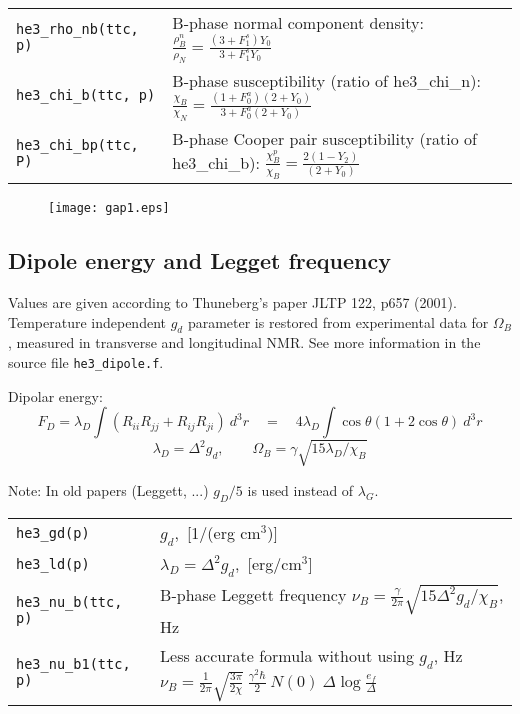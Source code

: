 \documentclass[a4paper]{article}
\begin{document}
\begin{tabular}{lp{11cm}}
\tt he3\_rho\_nb(ttc, p)     &B-phase normal component density:
                             $\displaystyle \frac{\rho_B^n}{\rho_{N}} =
                               \frac{(3 + F_1^s) Y_0}{3 + F_1^s Y_0}$\\[3mm]
\tt he3\_chi\_b(ttc, p)      &B-phase susceptibility (ratio of he3\_chi\_n):
                             $\displaystyle \frac{\chi_B}{\chi_N} =
                               \frac{(1+F_0^a)(2 + Y_0)}
                                     {3+F_0^a(2 + Y_0)}$\\[3mm]
\tt he3\_chi\_bp(ttc, P)     &B-phase Cooper pair susceptibility (ratio of he3\_chi\_b):
                             $\displaystyle \frac{\chi^p_B}{\chi_B} =
                               \frac{2 (1-Y_2)}{(2 + Y_0)}$\\
\end{tabular}
\medskip

\begin{figure}[h]
\texttt{[image: gap1.eps]}\\
\end{figure}
\eject

\subsection*{Dipole energy and Legget frequency}

Values are given according to Thuneberg's paper JLTP 122, p657 (2001).
Temperature independent $g_d$ parameter is restored from experimental
data for $\Omega_B$, measured in transverse and longitudinal NMR.
See more information in the source file {\tt he3\_dipole.f}.

Dipolar energy:
$$
F_D = \lambda_D \int (R_{ii}R_{jj}+R_{ij}R_{ji})\ d^3r
\quad =\quad 4 \lambda_D \int \cos\theta(1+2\cos\theta)\ d^3r
$$
$$
\lambda_D = \Delta^2 g_d,
\qquad \Omega_B = \gamma \sqrt{15 \lambda_D/\chi_B}
$$

Note: In old papers (Leggett, ...) $g_D/5$ is used instead of $\lambda_G$.

\medskip
\noindent\begin{tabular}{lp{11cm}}
\tt he3\_gd(p) & $g_d$,~[1/(erg cm$^3$)]\\
\tt he3\_ld(p) & $\lambda_D = \Delta^2 g_d$,~[erg/cm$^3$]\\
\tt he3\_nu\_b(ttc, p) &B-phase Leggett frequency
                             $\displaystyle \nu_B = \frac{\gamma}{2\pi}
                               \sqrt{15 \Delta^2 g_d/\chi_B}$, Hz\\

\tt he3\_nu\_b1(ttc, p)  & Less accurate formula without using $g_d$, Hz\newline
                             $\displaystyle \nu_B =\frac{1}{2\pi}\sqrt{\frac{3\pi}{2\chi}}
                             \ \frac{\gamma^2\hbar}{2}\ N(0)\ \Delta \log\frac{e_f}{\Delta}$\\
\end{tabular}
\medskip
\end{document}
